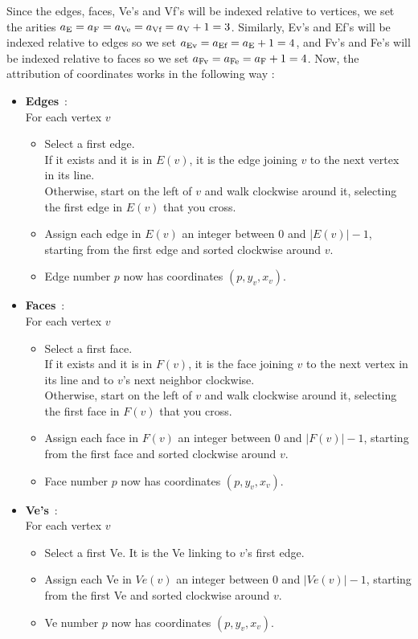 \documentclass{article}
\begin{document}
Since the edges, faces, Ve's and Vf's will be indexed relative to vertices, we set the arities $a_\text E = a_\text F = a_\text{Ve} = a_\text{Vf} = a_\text V+1 = 3$. Similarly, Ev's and Ef's will be indexed relative to edges so we set $a_\text{Ev} = a_\text{Ef} = a_\text E+1 = 4$, and Fv's and Fe's will be indexed relative to faces so we set $a_\text{Fv} = a_\text{Fe} = a_\text F+1 = 4$. Now, the attribution of coordinates works in the following way :
\begin{itemize}
	\item \textbf{Edges}~:\\
	For each vertex $v$
	\begin{itemize}[noitemsep, nosep, label=-]
		\item Select a first edge.\\
		If it exists and it is in $E(v)$, it is the edge joining $v$ to the next vertex in its line.\\
		Otherwise, start on the left of $v$ and walk clockwise around it, selecting the first edge in $E(v)$ that you cross.
		\item Assign each edge in $E(v)$ an integer between 0 and $|E(v)|-1$, starting from the first edge and sorted clockwise around $v$.
		\item Edge number $p$ now has coordinates $(p, y_v, x_v)$.
	\end{itemize}
	
	\item \textbf{Faces}~:\\
	For each vertex $v$
	\begin{itemize}[noitemsep, nosep, label=-]
		\item Select a first face.\\
		If it exists and it is in $F(v)$, it is the face joining $v$ to the next vertex in its line and to $v$'s next neighbor clockwise.\\
		Otherwise, start on the left of $v$ and walk clockwise around it, selecting the first face in $F(v)$ that you cross.
		\item Assign each face in $F(v)$ an integer between 0 and $|F(v)|-1$, starting from the first face and sorted clockwise around $v$.
		\item Face number $p$ now has coordinates $(p, y_v, x_v)$.
	\end{itemize}
	
	\item \textbf{Ve's}~:\\
	For each vertex $v$
	\begin{itemize}[noitemsep, nosep, label=-]
		\item Select a first Ve. It is the Ve linking to $v$'s first edge.
		\item Assign each Ve in $Ve(v)$ an integer between 0 and $|Ve(v)|-1$, starting from the first Ve and sorted clockwise around $v$.
		\item Ve number $p$ now has coordinates $(p, y_v, x_v)$.
	\end{itemize}
	

\end{itemize}
\end{document}
